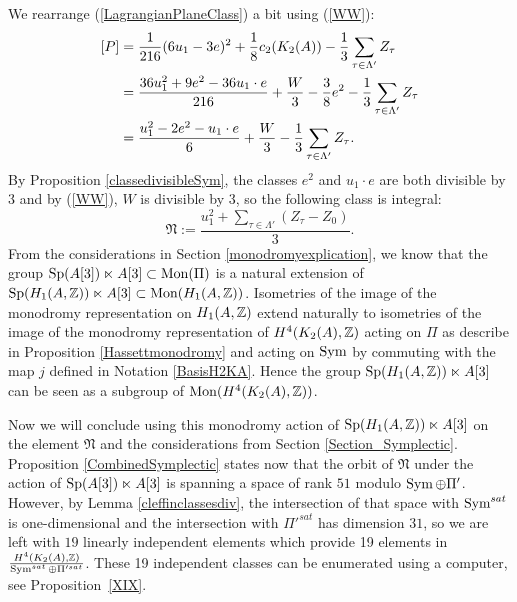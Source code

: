We rearrange (\ref{LagrangianPlaneClass}) a bit using (\ref{WW}):
\begin{align*}
\left[P\right]&=\frac{1}{216}(6u_1-3e)^2+\frac{1}{8}c_2(K_{ 2 }( A ))-\frac{1}{3}\sum_{\tau\in \Lambda'} Z_{\tau}\\
&=\frac{36u_1^2+9e^2-36u_1\cdot e}{216} +\frac{W}{3}-\frac{3}{8}e^2-\frac{1}{3}\sum_{\tau\in \Lambda'} Z_{\tau}\\
&=\frac{u_1^2-2e^2-u_1\cdot e}{6} +\frac{W}{3}-\frac{1}{3}\sum_{\tau\in \Lambda'} Z_{\tau}.
\end{align*}
By Proposition \ref{classedivisibleSym}, the classes $e^2$ and $u_1\cdot e$ are both divisible by 3 and by (\ref{WW}), $W$ is divisible by 3, so the following class is integral:
$$
\mathfrak{N}:=\frac{u_1^2+\sum_{\tau\in \Lambda'} (Z_{\tau}-Z_0)}{3}
.
$$
From the considerations in Section \ref{monodromyexplication}, we know that the group $\operatorname{Sp}(A[3])\ltimes A[3]\subset \operatorname{Mon}(\Pi)$ is a natural extension of 
$\operatorname{Sp}(H_1(A,\mathbb{Z}))\ltimes A[3]\subset \operatorname{Mon}(H_1(A,\mathbb{Z}))$. Isometries of the image of the monodromy representation on $H_1(A,\mathbb{Z})$ extend naturally to isometries of the image of the monodromy representation of $H^4(K_2(A),\mathbb{Z})$ acting on $\Pi$ as describe in Proposition \ref{Hassettmonodromy} and acting on $\operatorname{Sym}$ by commuting with the map $j$ defined in Notation \ref{BasisH2KA}.
Hence the group $\operatorname{Sp}(H_1(A,\mathbb{Z}))\ltimes A[3]$ can be seen as a subgroup of $\operatorname{Mon}(H^4(K_2(A),\mathbb{Z}))$. 

Now we will conclude using this monodromy action of $\operatorname{Sp}(H_1(A,\mathbb{Z}))\ltimes A[3]$ on the element $\mathfrak{N}$ and the considerations from Section \ref{Section_Symplectic}. 
Proposition \ref{CombinedSymplectic} states now that
the orbit of $\mathfrak{N}$ under the action of $\operatorname{Sp}(A[3])\ltimes A[3]$ is spanning a space of rank $51$ modulo $\operatorname{Sym}\oplus\Pi'$. However, by Lemma \ref{cleffinclassesdiv}, the intersection of that space with $\operatorname{Sym}^{sat}$ is one-dimensional and the intersection with $\Pi'^{sat}$ has dimension $31$, so we are left with $19$ linearly independent elements which provide 19 elements in $\frac{H^4(K_2(A),\mathbb{Z})}{\operatorname{Sym}^{sat}\oplus\Pi'^{sat}}$.
These 19 independent classes can be enumerated using a computer, see Proposition~\ref{XIX}. 

